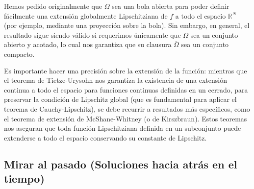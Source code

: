 \begin{observación}
    Hemos pedido originalmente que $\Omega$ sea una bola abierta para poder definir fácilmente una extensión globalmente Lipschitziana de $f$ a todo el espacio $\mathbb{R}^N$ (por ejemplo, mediante una proyección sobre la bola). Sin embargo, en general, el resultado sigue siendo válido si requerimos únicamente que $\Omega$ sea un conjunto abierto y acotado, lo cual nos garantiza que su clausura $\overline{\Omega}$ sea un conjunto compacto. 
    
    Es importante hacer una precisión sobre la extensión de la función: mientras que el teorema de Tietze-Urysohn nos garantiza la existencia de una extensión continua a todo el espacio para funciones continuas definidas en un cerrado, para preservar la condición de Lipschitz global (que es fundamental para aplicar el teorema de Cauchy-Lipschitz), se debe recurrir a resultados más específicos, como el teorema de extensión de McShane-Whitney (o de Kirszbraun). Estos teoremas nos aseguran que toda función Lipschitziana definida en un subconjunto puede extenderse a todo el espacio conservando su constante de Lipschitz.
\end{observación}

\subsection{Mirar al pasado (Soluciones hacia atrás en el tiempo)}

